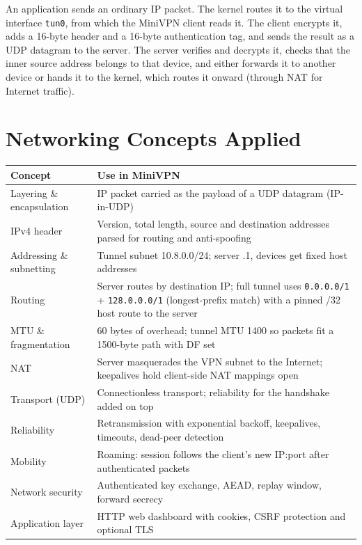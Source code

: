 \documentclass[12pt,a4paper]{article}
\begin{document}
An application sends an ordinary IP packet. The kernel routes it to the virtual
interface \texttt{tun0}, from which the MiniVPN client reads it. The client encrypts it,
adds a 16-byte header and a 16-byte authentication tag, and sends the result as a UDP
datagram to the server. The server verifies and decrypts it, checks that the inner
source address belongs to that device, and either forwards it to another device or
hands it to the kernel, which routes it onward (through NAT for Internet traffic).

\section{Networking Concepts Applied}
\begin{tabularx}{\textwidth}{@{}lX@{}}
\toprule
\textbf{Concept} & \textbf{Use in MiniVPN}\\
\midrule
Layering \& encapsulation & IP packet carried as the payload of a UDP datagram (IP-in-UDP)\\
IPv4 header & Version, total length, source and destination addresses parsed for routing and anti-spoofing\\
Addressing \& subnetting & Tunnel subnet 10.8.0.0/24; server .1, devices get fixed host addresses\\
Routing & Server routes by destination IP; full tunnel uses \texttt{0.0.0.0/1} + \texttt{128.0.0.0/1} (longest-prefix match) with a pinned /32 host route to the server\\
MTU \& fragmentation & 60 bytes of overhead; tunnel MTU 1400 so packets fit a 1500-byte path with DF set\\
NAT & Server masquerades the VPN subnet to the Internet; keepalives hold client-side NAT mappings open\\
Transport (UDP) & Connectionless transport; reliability for the handshake added on top\\
Reliability & Retransmission with exponential backoff, keepalives, timeouts, dead-peer detection\\
Mobility & Roaming: session follows the client's new IP:port after authenticated packets\\
Network security & Authenticated key exchange, AEAD, replay window, forward secrecy\\
Application layer & HTTP web dashboard with cookies, CSRF protection and optional TLS\\
\bottomrule
\end{tabularx}
\end{document}
